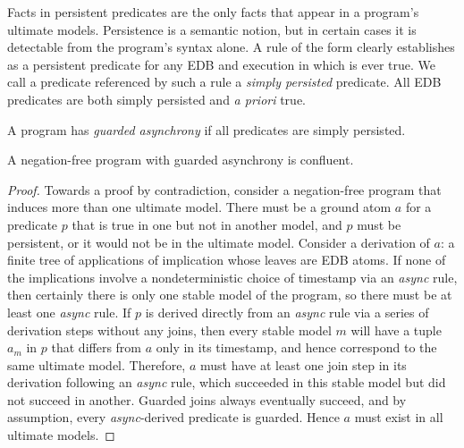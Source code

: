 Facts in persistent predicates are the only facts that appear in a program's ultimate models.
Persistence is a semantic notion, but in certain cases it is detectable from the program's 
syntax alone.  A rule of the form  clearly establishes  as a persistent predicate for any EDB and execution in which  is ever true. 
We call a predicate referenced by such a rule
a {\em simply persisted} predicate.  All EDB predicates are both simply persisted and 
{\em a priori} true.

\begin{definition}
A \lang program has {\em guarded asynchrony} if all  predicates are simply persisted.
\end{definition}

\begin{lemma}
\label{lem:guarding}
A negation-free \lang program with guarded asynchrony is confluent.
\end{lemma}
\begin{proof}


Towards a proof by contradiction, consider a negation-free \lang program that 
induces more than one ultimate model.  There must be a ground atom $a$ for a predicate $p$
that is true in one but
not in another model, and $p$ must be persistent, or it would not be
in the ultimate model.  Consider a derivation of $a$: a finite tree of applications of
implication whose leaves are EDB atoms.  If none of the implications involve a nondeterministic
choice of timestamp via an {\em async} rule, then certainly there is only one stable model of the
program, so there must be at least one {\em async} rule.  If $p$ is derived directly from 
an {\em async} rule via a series of derivation steps without any joins, then every stable
model $m$ will have a tuple $a_m$ in $p$ that differs from $a$ only in its timestamp, 
and hence correspond to the same ultimate model.
Therefore, $a$ must have at least one join step in its derivation following an {\em async} rule,
which succeeded in this stable model but did not succeed in another.  Guarded joins always
eventually succeed, and by assumption, every {\em async}-derived predicate is guarded.
Hence $a$ must exist in all ultimate models.

\end{proof}


